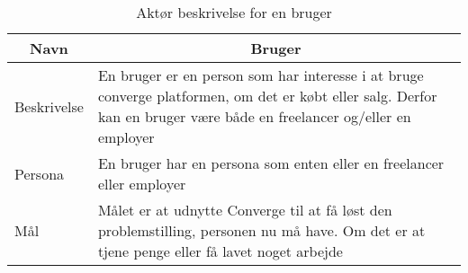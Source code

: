 \begin{table}[H]
    \begin{small}
        \caption{Aktør beskrivelse for en bruger}
        \label{tab:bruger}
        \begin{center}
            \begin{tabular}[c]{l|l}
                \multicolumn{1}{c|}{\textbf{Navn}} & \multicolumn{1}{c}{\textbf{Bruger}}                                                                                                                                                             \\
                \hline
                Beskrivelse                        & \multicolumn{1}{p{10cm}}{En bruger er en person som har interesse i at bruge converge platformen, om det er købt eller salg. Derfor kan en bruger være både en freelancer og/eller en employer} \\
                \hline
                Persona                            & \multicolumn{1}{p{10cm}}{En bruger har en persona som enten eller en freelancer eller employer}                                                                                                 \\
                \hline
                Mål                                & \multicolumn{1}{p{10cm}}{Målet er at udnytte Converge til at få løst den problemstilling, personen nu må have. Om det er at tjene penge eller få lavet noget arbejde}                           \\
            \end{tabular}
        \end{center}
    \end{small}
\end{table}



